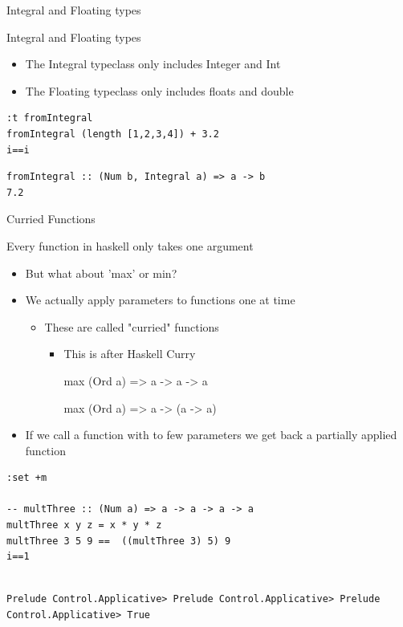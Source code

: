\documentclass[presetation]{beamer}
\begin{document}
\begin{frame}[fragile,label={sec:org720dcb1}]{Integral and Floating types}
 \begin{block}{Integral and Floating types}
\begin{itemize}
\item The Integral typeclass only includes Integer and Int
\item The Floating typeclass only includes floats and double
\end{itemize}
\begin{verbatim}
:t fromIntegral
fromIntegral (length [1,2,3,4]) + 3.2
i==i
\end{verbatim}

\begin{verbatim}
fromIntegral :: (Num b, Integral a) => a -> b
7.2
\end{verbatim}
\end{block}
\end{frame}


\begin{frame}[fragile,label={sec:org3c478b1}]{Curried Functions}
 \begin{block}{Every function in haskell only takes one argument}
\begin{itemize}
\item But what about  'max' or min?
\item We actually apply parameters to functions one at time
\begin{itemize}
\item These are called "curried" functions
\begin{itemize}
\item This is after Haskell Curry
\item[{max}] (Ord a) => a -> a -> a
\item[{max}] (Ord a) => a -> (a -> a)
\end{itemize}
\end{itemize}
\item If we call a function with to few parameters we get back a partially
applied function
\end{itemize}
\begin{verbatim}
:set +m

-- multThree :: (Num a) => a -> a -> a -> a  
multThree x y z = x * y * z  
multThree 3 5 9 ==  ((multThree 3) 5) 9
i==1
\end{verbatim}

\begin{verbatim}

Prelude Control.Applicative> Prelude Control.Applicative> Prelude Control.Applicative> True
\end{verbatim}
\end{block}
\end{frame}
\end{document}

